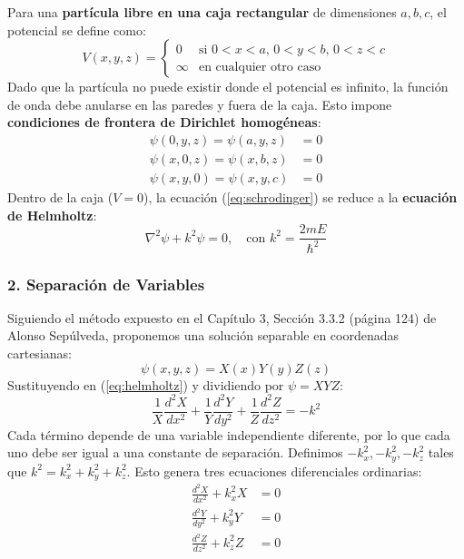 \documentclass[a4paper]{article}
\begin{document}
Para una \textbf{partícula libre en una caja rectangular} de dimensiones $a, b, c$, el potencial se define como:
\begin{equation}
V(x, y, z) = \begin{cases} 
0 & \text{si } 0 < x < a, \, 0 < y < b, \, 0 < z < c \\
\infty & \text{en cualquier otro caso}
\end{cases}
\end{equation}
Dado que la partícula no puede existir donde el potencial es infinito, la función de onda debe anularse en las paredes y fuera de la caja. Esto impone \textbf{condiciones de frontera de Dirichlet homogéneas}:
\begin{align}
\psi(0, y, z) = \psi(a, y, z) &= 0 \label{eq:bc_x} \\
\psi(x, 0, z) = \psi(x, b, z) &= 0 \label{eq:bc_y} \\
\psi(x, y, 0) = \psi(x, y, c) &= 0 \label{eq:bc_z}
\end{align}
Dentro de la caja ($V=0$), la ecuación (\ref{eq:schrodinger}) se reduce a la \textbf{ecuación de Helmholtz}:
\begin{equation}
\nabla^2\psi + k^2\psi = 0, \quad \text{con } k^2 = \frac{2mE}{\hbar^2}
\label{eq:helmholtz}
\end{equation}

\subsubsection{2. Separación de Variables}

Siguiendo el método expuesto en el Capítulo 3, Sección 3.3.2 (página 124) de Alonso Sepúlveda, proponemos una solución separable en coordenadas cartesianas:
\begin{equation}
\psi(x, y, z) = X(x)Y(y)Z(z)
\end{equation}
Sustituyendo en (\ref{eq:helmholtz}) y dividiendo por $\psi = XYZ$:
\begin{equation}
\frac{1}{X}\frac{d^2X}{dx^2} + \frac{1}{Y}\frac{d^2Y}{dy^2} + \frac{1}{Z}\frac{d^2Z}{dz^2} = -k^2
\end{equation}
Cada término depende de una variable independiente diferente, por lo que cada uno debe ser igual a una constante de separación. Definimos $-k_x^2, -k_y^2, -k_z^2$ tales que $k^2 = k_x^2 + k_y^2 + k_z^2$. Esto genera tres ecuaciones diferenciales ordinarias:
\begin{align}
\frac{d^2X}{dx^2} + k_x^2 X &= 0 \label{eq:ode_x} \\
\frac{d^2Y}{dy^2} + k_y^2 Y &= 0 \label{eq:ode_y} \\
\frac{d^2Z}{dz^2} + k_z^2 Z &= 0 \label{eq:ode_z}
\end{align}
\end{document}
